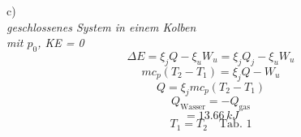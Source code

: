 c) \\
\textit{geschlossenes System in einem Kolben} \\
\textit{mit $p_0$, KE = 0} \\
\[
\Delta E = \xi_j Q - \xi_u W_u = \xi_j Q_j - \xi_u W_u
\]
\[
m c_p (T_2 - T_1) = \xi_j Q - W_u
\]
\[
Q = \xi_j m c_p (T_2 - T_1)
\]
\[
Q_{\text{Wasser}} = -Q_{\text{gas}}
\]
\[
= 13.66 \, kJ
\]
\[
T_1 = T_2 \quad \text{Tab. 1}
\]